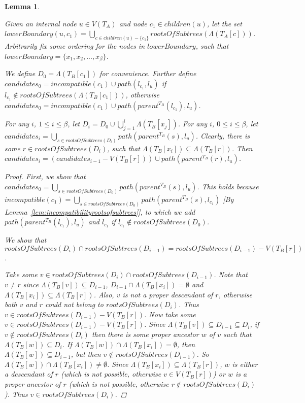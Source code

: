 \documentclass{article}
\newcommand{\leafset}{\Lambda}
\newtheorem{incompatiblecandidates}[incompatibility]{Lemma}
\begin{document}
    \begin{incompatiblecandidates}
        \label{lem:incompatiblecandidates}

        Given an internal node $u \in V(T_A)$ and node $c_1 \in children(u)$, let the set $lowerBoundary(u, c_1) = \bigcup_{c \in children(u) - \{c_1\}} rootsOfSubtrees(\leafset(T_A[c]))$. Arbitrarily fix some ordering for the nodes in $lowerBoundary$, such that $lowerBoundary = \{x_1, x_2, ..., x_{\beta}\}$.

        We define $D_0 = \leafset(T_B[c_1])$ for convenience. Further define $candidates_0 = incompatible(c_1) \cup path(l_{c_1}, l_u)$ if $l_{c_1} \not\in rootsOfSubtrees(\leafset(T_B[c_1]))$, otherwise $candidates_0 = incompatible(c_1) \cup path(parent^{T_B}(l_{c_1}), l_u)$.

        For any $i$, $1 \leq i \leq \beta$, let $D_i = D_0 \cup \bigcup_{j = 1}^{i} \leafset(T_B[x_j])$. For any $i$, $0 \leq i \leq \beta$, let $candidates_i = \bigcup_{s \in rootsOfSubtrees(D_i)} path(parent^{T_B}(s), l_u)$. Clearly, there is some $r \in rootsOfSubtrees(D_i)$, such that $\leafset(T_B[x_i]) \subseteq \leafset(T_B[r])$. Then $candidates_i = (candidates_{i-1} - V(T_B[r])) \cup path(parent^{T_B}(r), l_u)$.

        \begin{proof}
            First, we show that $candidates_0 = \bigcup_{s \in rootsOfSubtrees(D_0)} path(parent^{T_B}(s), l_u)$. This holds because $incompatible(c_1) = \bigcup_{s \in rootsOfSubtrees(D_0)} path(parent^{T_B}(s), l_{c_1})$ [By Lemma~\ref{lem:incompatibilityrootsofsubtrees}], to which we add $path(parent^{T_B}(l_{c_1}), l_u)$ and $l_{c_1}$ if $l_{c_1} \not\in rootsOfSubtrees(D_0)$.

            We show that $rootsOfSubtrees(D_i) \cap rootsOfSubtrees(D_{i-1}) = rootsOfSubtrees(D_{i-1}) - V(T_B[r])$.

            Take some $v \in rootsOfSubtrees(D_i) \cap rootsOfSubtrees(D_{i-1})$. Note that $v \neq r$ since $\leafset(T_B[v]) \subseteq D_{i-1}$, $D_{i-1} \cap \leafset(T_B[x_i]) = \emptyset$ and $\leafset(T_B[x_i]) \subseteq \leafset(T_B[r])$. Also, $v$ is not a proper descendant of $r$, otherwise both $v$ and $r$ could not belong to $rootsOfSubtrees(D_i)$. Thus $v \in rootsOfSubtrees(D_{i-1}) - V(T_B[r])$. Now take some $v \in rootsOfSubtrees(D_{i-1}) - V(T_B[r])$. Since $\leafset(T_B[v]) \subseteq D_{i-1} \subseteq D_i$, if $v \not\in rootsOfSubtrees(D_i)$ then there is some proper ancestor $w$ of $v$ such that $\leafset(T_B[w]) \subseteq D_i$. If $\leafset(T_B[w]) \cap \leafset(T_B[x_i]) = \emptyset$, then $\leafset(T_B[w]) \subseteq D_{i-1}$, but then $v \not\in rootsOfSubtrees(D_{i-1})$. So $\leafset(T_B[w]) \cap \leafset(T_B[x_i]) \neq \emptyset$. Since $\leafset(T_B[x_i]) \subseteq \leafset(T_B[r])$, $w$ is either a descendant of $r$ (which is not possible, otherwise $v \in V(T_B[r])$) or $w$ is a proper ancestor of $r$ (which is not possible, otherwise $r \not\in rootsOfSubtrees(D_i)$). Thus $v \in rootsOfSubtrees(D_i)$.


\end{proof}
\end{incompatiblecandidates}
\end{document}
